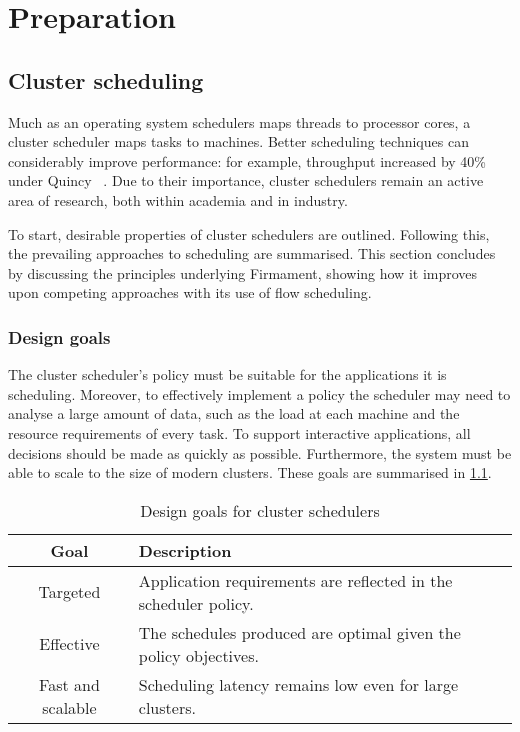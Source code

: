 \chapter{Preparation} \label{chap:prep}

\section{Cluster scheduling} \label{sec:prep-scheduling}


Much as an operating system schedulers maps threads to processor cores, a cluster scheduler maps tasks to machines. Better scheduling techniques can considerably improve performance: for example, throughput increased by 40\% under Quincy ~\cite{Isard:2009}. Due to their importance, cluster schedulers remain an active area of research, both within academia and in industry.

To start, desirable properties of cluster schedulers are outlined. Following this, the prevailing approaches to scheduling are summarised. This section concludes by discussing the principles underlying Firmament, showing how it improves upon competing approaches with its use of flow scheduling.

\subsection{Design goals} \label{sec:prep-scheduling-goals}


The cluster scheduler's policy must be suitable for the applications it is scheduling. Moreover, to effectively implement a policy the scheduler may need to analyse a large amount of data, such as the load at each machine and the resource requirements of every task. To support interactive applications, all decisions should be made as quickly as possible. Furthermore, the system must be able to scale to the size of modern clusters. These goals are summarised in \cref{table:cluster-scheduler-design-goals}.

\begin{table}
    \centering
    \begin{tabular}{c|l}
        \textbf{Goal} & \textbf{Description}\tabularnewline
        \hline
        Targeted & Application requirements are reflected in the scheduler policy. \tabularnewline
        Effective & The schedules produced are optimal given the policy objectives. \tabularnewline
        Fast and scalable & Scheduling latency remains low even for large clusters. \tabularnewline
        \hline
    \end{tabular}
    \caption{Design goals for cluster schedulers}
    \label{table:cluster-scheduler-design-goals}
\end{table}

